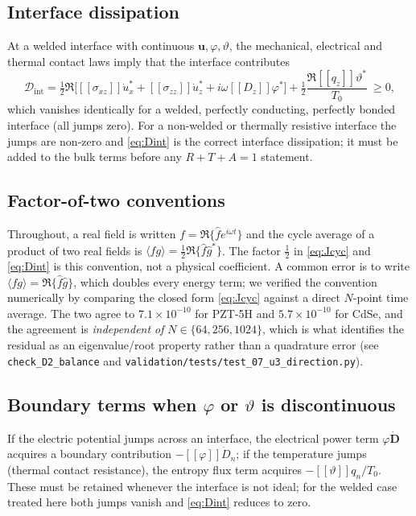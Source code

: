 \documentclass[11pt]{article}
\newcommand{\s}{\sigma}
\newcommand{\bth}{\vartheta}
\newcommand{\D}{\bm{D}}
\newcommand{\bu}{\bm{u}}
\newcommand{\jmp}[1]{[\![#1]\!]}
\theoremstyle{plain}
\begin{document}
\subsection{Interface dissipation}

At a welded interface with continuous $\bu,\varphi,\bth$, the mechanical,
electrical and thermal contact laws imply that the interface contributes
\begin{equation}
\mathcal D_{\mathrm{int}}
=\tfrac12\Re\bigl[\jmp{\s_{xz}}\dot u_x^*+\jmp{\s_{zz}}\dot u_z^*
+i\omega\jmp{D_z}\varphi^*\bigr]
+\tfrac12\frac{\Re\jmp{q_z}\bth^*}{T_0}\ \ge 0 ,
\label{eq:Dint}
\end{equation}
which vanishes identically for a welded, perfectly conducting, perfectly
bonded interface (all jumps zero). For a non-welded or thermally resistive
interface the jumps are non-zero and \eqref{eq:Dint} is the correct interface
dissipation; it must be added to the bulk terms before any $R+T+A=1$ statement.

\subsection{Factor-of-two conventions}

Throughout, a real field is written $f=\Re\{\hat f e^{i\omega t}\}$ and the
cycle average of a product of two real fields is
$\langle fg\rangle=\tfrac12\Re\{\hat f\hat g^*\}$. The factor $\tfrac12$ in
\eqref{eq:Jcyc} and \eqref{eq:Dint} is this convention, not a physical
coefficient. A common error is to write $\langle fg\rangle=\Re\{\hat f\hat g\}$,
which doubles every energy term; we verified the convention numerically by
comparing the closed form \eqref{eq:Jcyc} against a direct $N$-point time
average. The two agree to $7.1\times10^{-10}$ for PZT-5H and
$5.7\times10^{-10}$ for CdSe, and the agreement is \emph{independent of}
$N\in\{64,256,1024\}$, which is what identifies the residual as an
eigenvalue/root property rather than a quadrature error (see
\texttt{check\_D2\_balance} and \texttt{validation/tests/test\_07\_u3\_direction.py}).

\subsection{Boundary terms when $\varphi$ or $\bth$ is discontinuous}

If the electric potential jumps across an interface, the electrical power
term $\varphi\dot{\D}$ acquires a boundary contribution
$-\jmp{\varphi}\dot D_n$; if the temperature jumps (thermal contact
resistance), the entropy flux term acquires $-\jmp{\bth}q_n/T_0$. These must be
retained whenever the interface is not ideal; for the welded case treated here
both jumps vanish and \eqref{eq:Dint} reduces to zero.
\end{document}
